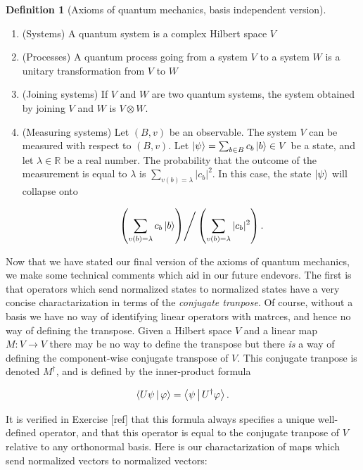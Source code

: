 \documentclass{article}
\theoremstyle{definition}
\newtheorem*{definition}{Definition}
\newcommand{\RR}{\mathbb{R}}
\newcommand{\0}{\left|0\right>}
\newcommand{\1}{\left|1\right>}
\numberwithin{figure}{section}
\begin{document}
\begin{definition}[Axioms of quantum mechanics, basis independent version] $\,$

\begin{enumerate}
\item (Systems) A quantum system is a complex Hilbert space $V$
\item (Processes) A quantum process going from a system $V$ to a system $W$ is a unitary transformation from $V$ to $W$
\item (Joining systems) If $V$ and $W$ are two quantum systems, the system obtained by joining $V$ and $W$ is $V\otimes W$.
\item (Measuring systems) Let $(B,v)$ be an observable. The system $V$ can be measured with respect to $(B,v)$. Let $\ket{\psi}=\sum_{b\in B}c_b \ket{b}\in V$ be a state, and let $\lambda\in \RR$ be a real number. The probability that the outcome of the measurement is equal to $\lambda$ is $\sum_{v(b)=\lambda}|c_b|^2$. In this case, the state $\ket{\psi}$ will collapse onto

$$\left.\left(\sum_{v(b)=\lambda}c_b \ket{b}\right)\right/ \left(\sum_{v(b)=\lambda}|c_b|^2\right).$$
\end{enumerate}

\raggedleft\qedsymbol{}
\end{definition}

Now that we have stated our final version of the axioms of quantum mechanics, we make some technical comments which aid in our future endevors. The first is that operators which send normalized states to normalized states have a very concise charactarization in terms of the \textit{conjugate tranpose}. Of course, without a basis we have no way of identifying linear operators with matrces, and hence no way of defining the transpose. Given a Hilbert space $V$ and a linear map $M:V\to V$ there may be no way to define the transpose but there \textit{is} a way of defining the component-wise conjugate transpose of $V$. This conjugate tranpose is denoted $M^\dagger$, and is defined by the inner-product formula

$$\Braket{ U \psi  | \varphi}=\Braket{\psi | U^\dagger \varphi}.$$

It is verified in Exercise [ref] that this formula always specifies a unique well-defined operator, and that this operator is equal to the conjugate tranpose of $V$ relative to any orthonormal basis. Here is our charactarization of maps which send normalized vectors to normalized vectors:
\end{document}
